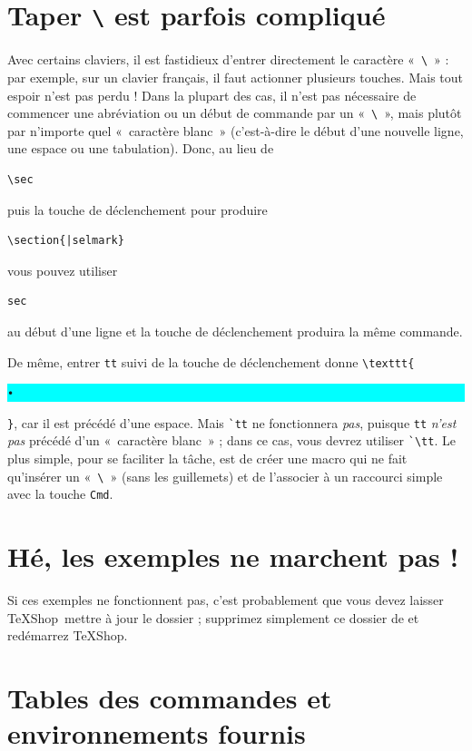 \documentclass[11pt]{article}
\newcommand{\mnu}[1]{\texttt{#1}}
\newcommand{\cmd}[1]{\texttt{#1}}
\newcommand{\selmark}{\colorbox{cyan}{\rule[-0.5ex]{0ex}{2.1ex}\texttt{•}}}
\newcommand{\TS}{\textsf{\TeX Shop}}
\begin{document}
\section*{Taper \cmd{\textbackslash} est parfois compliqué}

Avec certains claviers, il est fastidieux d’entrer directement le caractère «~\verb|\|~» : par exemple, sur un clavier français, il faut actionner plusieurs touches. Mais tout espoir n’est pas perdu ! Dans la plupart des cas, il n’est pas nécessaire de commencer une abréviation ou un début de commande par un «~\verb|\|~», mais plutôt par n’importe quel «~caractère blanc~» (c’est-à-dire le début d’une nouvelle ligne, une espace ou une tabulation). Donc, au lieu de
\begin{verbatim}
\sec
\end{verbatim}
puis la touche de déclenchement pour produire
\begin{verbatim}
\section{|selmark}
\end{verbatim}
vous pouvez utiliser
\begin{verbatim}
sec
\end{verbatim}
au début d’une ligne et la touche de déclenchement produira la même commande.

De même, entrer \verb|tt| suivi de la touche de déclenchement donne \verb|\texttt{|\selmark\verb|}|, car il est précédé d’une espace. Mais \verb|`tt| ne fonctionnera \emph{pas}, puisque \verb|tt| \emph{n’est pas} précédé d’un «~caractère blanc~» ; dans ce cas, vous devrez utiliser \verb|`\tt|. Le plus simple, pour se faciliter la tâche, est de créer une macro qui ne fait qu’insérer un «~\verb|\|~» (sans les guillemets) et de l’associer à un raccourci simple avec la touche \mnu{Cmd}.

\section*{Hé, les exemples ne marchent pas !}

Si ces exemples ne fonctionnent pas, c’est probablement que vous devez laisser \TS\ mettre à jour le dossier  ; supprimez simplement ce dossier de  et redémarrez \TS.

\section*{Tables des commandes et environnements fournis}
\end{document}
